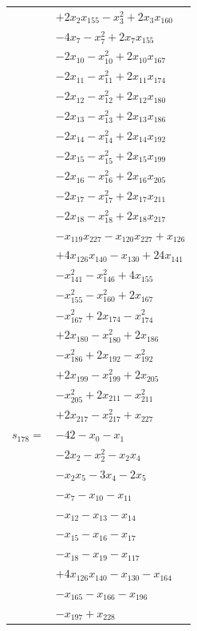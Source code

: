 \begin{longtable}{@{}r@{\;}l@{}}
 & \(\displaystyle +2x_{2}x_{155} -x_{3}^{2} +2x_{3}x_{160}\) \\
 & \(\displaystyle -4x_{7} -x_{7}^{2} +2x_{7}x_{155}\) \\
 & \(\displaystyle -2x_{10} -x_{10}^{2} +2x_{10}x_{167}\) \\
 & \(\displaystyle -2x_{11} -x_{11}^{2} +2x_{11}x_{174}\) \\
 & \(\displaystyle -2x_{12} -x_{12}^{2} +2x_{12}x_{180}\) \\
 & \(\displaystyle -2x_{13} -x_{13}^{2} +2x_{13}x_{186}\) \\
 & \(\displaystyle -2x_{14} -x_{14}^{2} +2x_{14}x_{192}\) \\
 & \(\displaystyle -2x_{15} -x_{15}^{2} +2x_{15}x_{199}\) \\
 & \(\displaystyle -2x_{16} -x_{16}^{2} +2x_{16}x_{205}\) \\
 & \(\displaystyle -2x_{17} -x_{17}^{2} +2x_{17}x_{211}\) \\
 & \(\displaystyle -2x_{18} -x_{18}^{2} +2x_{18}x_{217}\) \\
 & \(\displaystyle -x_{119}x_{227} -x_{120}x_{227} +x_{126}\) \\
 & \(\displaystyle +4x_{126}x_{140} -x_{130} +24x_{141}\) \\
 & \(\displaystyle -x_{141}^{2} -x_{146}^{2} +4x_{155}\) \\
 & \(\displaystyle -x_{155}^{2} -x_{160}^{2} +2x_{167}\) \\
 & \(\displaystyle -x_{167}^{2} +2x_{174} -x_{174}^{2}\) \\
 & \(\displaystyle +2x_{180} -x_{180}^{2} +2x_{186}\) \\
 & \(\displaystyle -x_{186}^{2} +2x_{192} -x_{192}^{2}\) \\
 & \(\displaystyle +2x_{199} -x_{199}^{2} +2x_{205}\) \\
 & \(\displaystyle -x_{205}^{2} +2x_{211} -x_{211}^{2}\) \\
 & \(\displaystyle +2x_{217} -x_{217}^{2} +x_{227}\) \\[3pt]
\(s_{178}=\) & \(\displaystyle -42 -x_{0} -x_{1}\) \\
 & \(\displaystyle -2x_{2} -x_{2}^{2} -x_{2}x_{4}\) \\
 & \(\displaystyle -x_{2}x_{5} -3x_{4} -2x_{5}\) \\
 & \(\displaystyle -x_{7} -x_{10} -x_{11}\) \\
 & \(\displaystyle -x_{12} -x_{13} -x_{14}\) \\
 & \(\displaystyle -x_{15} -x_{16} -x_{17}\) \\
 & \(\displaystyle -x_{18} -x_{19} -x_{117}\) \\
 & \(\displaystyle +4x_{126}x_{140} -x_{130} -x_{164}\) \\
 & \(\displaystyle -x_{165} -x_{166} -x_{196}\) \\
 & \(\displaystyle -x_{197} +x_{228}\) \\[3pt]
\end{longtable}
\endgroup
